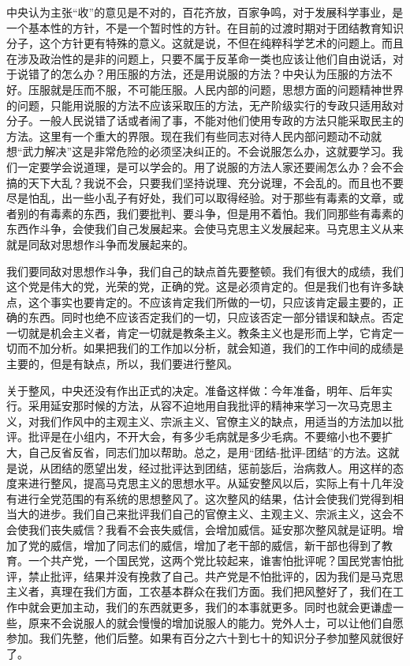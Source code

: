 中央认为主张“收”的意见是不对的，百花齐放，百家争鸣，对于发展科学事业，是一个基本性的方针，不是一个暂时性的方针。在目前的过渡时期对于团结教育知识分子，这个方针更有特殊的意义。这就是说，不但在纯粹科学艺术的问题上。而且在涉及政治性的是非的问题上，只要不属于反革命一类也应该让他们自由说话，对于说错了的怎么办？用压服的方法，还是用说服的方法？中央认为压服的方法不好。压服就是压而不服，不可能压服。人民内部的问题，思想方面的问题精神世界的问题，只能用说服的方法不应该采取压的方法，无产阶级实行的专政只适用敌对分子。一般人民说错了话或者闹了事，不能对他们使用专政的方法只能采取民主的方法。这里有一个重大的界限。现在我们有些同志对待人民内部问题动不动就想“武力解决”这是非常危险的必须坚决纠正的。不会说服怎么办，这就要学习。我们一定要学会说道理，是可以学会的。用了说服的方法人家还要闹怎么办？会不会搞的天下大乱？我说不会，只要我们坚持说理、充分说理，不会乱的。而且也不要尽是怕乱，出一些小乱子有好处，我们可以取得经验。对于那些有毒素的文章，或者别的有毒素的东西，我们要批判、要斗争，但是用不着怕。我们同那些有毒素的东西作斗争，会使我们自己发展起来。会使马克思主义发展起来。马克思主义从来就是同敌对思想作斗争而发展起来的。

我们要同敌对思想作斗争，我们自己的缺点首先要整顿。我们有很大的成绩，我们这个党是伟大的党，光荣的党，正确的党。这是必须肯定的。但是我们也有许多缺点，这个事实也要肯定的。不应该肯定我们所做的一切，只应该肯定最主要的，正确的东西。同时也绝不应该否定我们的一切，只应该否定一部分错误和缺点。否定一切就是机会主义者，肯定一切就是教条主义。教条主义也是形而上学，它肯定一切而不加分析。如果把我们的工作加以分析，就会知道，我们的工作中间的成绩是主要的，但是有缺点，所以，我们要进行整风。

关于整风，中央还没有作出正式的决定。准备这样做：今年准备，明年、后年实行。采用延安那时候的方法，从容不迫地用自我批评的精神来学习一次马克思主义，对我们作风中的主观主义、宗派主义、官僚主义的缺点，用适当的方法加以批评。批评是在小组内，不开大会，有多少毛病就是多少毛病。不要缩小也不要扩大，自己反省反省，同志们加以帮助。总之，是用“团结-批评-团结”的方法。这就是说，从团结的愿望出发，经过批评达到团结，惩前毖后，治病救人。用这样的态度来进行整风，提高马克思主义的思想水平。从延安整风以后，实际上有十几年没有进行全党范围的有系统的思想整风了。这次整风的结果，估计会使我们党得到相当大的进步。我们自己来批评我们自己的官僚主义、主观主义、宗派主义，这会不会使我们丧失威信？我看不会丧失威信，会增加威信。延安那次整风就是证明。增加了党的威信，增加了同志们的威信，增加了老干部的威信，新干部也得到了教育。一个共产党，一个国民党，这两个党比较起来，谁害怕批评呢？国民党害怕批评，禁止批评，结果并没有挽救了自己。共产党是不怕批评的，因为我们是马克思主义者，真理在我们方面，工农基本群众在我们方面。我们把风整好了，我们在工作中就会更加主动，我们的东西就更多，我们的本事就更多。同时也就会更谦虚一些，原来不会说服人的就会慢慢的增加说服人的能力。党外人士，可以让他们自愿参加。我们先整，他们后整。如果有百分之六十到七十的知识分子参加整风就很好了。

